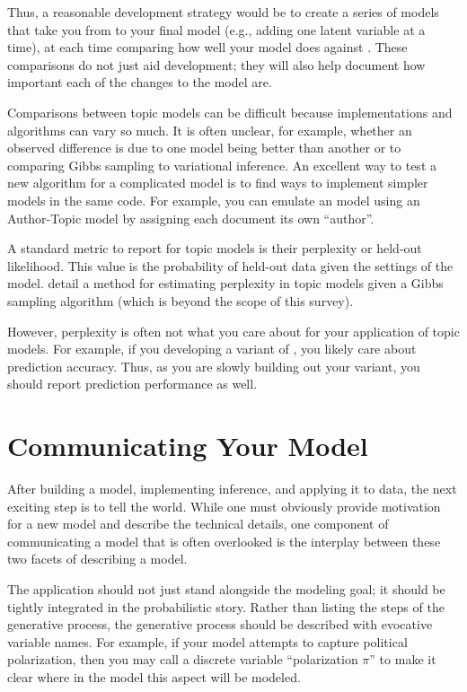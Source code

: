 Thus, a reasonable development strategy would be to create a series of
models that take you from  to your final model (e.g., adding
one latent variable at a time), at each time comparing how well your
model does against .  These comparisons do not just aid
development; they will also help document how important each of the
changes to the model are.

Comparisons between topic models can be difficult because implementations and algorithms can vary so much.
It is often unclear, for example, whether an observed difference is due to one model being better than another or to comparing Gibbs sampling to variational inference.
An excellent way to test a new algorithm for a complicated model is to find ways to implement simpler models in the same code.
For example, you can emulate an  model using an Author-Topic model \citep{rosen-zvi-04} by assigning each document its own ``author''.

A standard metric to report for topic models is their perplexity or
held-out likelihood.  This value is the probability of held-out data given
the settings of the model.  \citet{wallach-09a} detail a 
method for estimating perplexity in topic models given a Gibbs sampling algorithm (which is
beyond the scope of this survey).

However, perplexity is often not what you care about for your
application of topic models. For example, if you developing a variant
of , you likely care about prediction accuracy.  Thus, as
you are slowly building out your  variant, you should report
prediction performance as well.

\section{Communicating Your Model}

After building a model, implementing inference, and applying it to
data, the next exciting step is to tell the world.  While one must
obviously provide motivation for a new model and describe the
technical details, one component of communicating a model that is
often overlooked is the interplay between these two facets of
describing a model.

The application should not just stand alongside the modeling goal; it
should be tightly integrated in the probabilistic story.  Rather than
listing the steps of the generative process, the generative
process should be described with evocative variable names.  For
example, if your model attempts to capture political polarization,
then you may call a discrete variable ``polarization $\pi$'' to
make it clear where in the model this aspect will be modeled.

